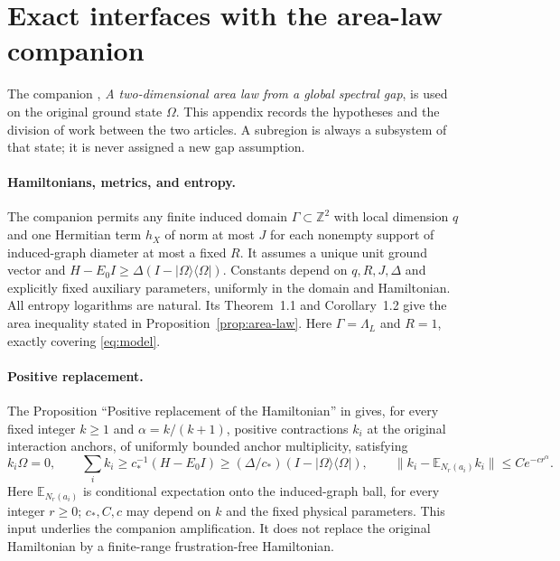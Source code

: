 \section{Exact interfaces with the area-law companion}
\label{app:companion}

The companion \cite{RepoAreaLaw}, \emph{A two-dimensional area law from a
global spectral gap}, is used on the original ground state $\Omega$.
This appendix records the hypotheses and the division of work between the
two articles. A subregion is always a subsystem of that state; it is never
assigned a new gap assumption.

\paragraph{Hamiltonians, metrics, and entropy.}
The companion permits any finite induced domain $\Gamma\subset\mathbb Z^2$
with local dimension $q$ and one Hermitian term $h_X$ of norm at most $J$
for each nonempty support of induced-graph diameter at most a fixed $R$.
It assumes a unique unit ground vector and
$H-E_0I\ge\Delta(I-|\Omega\rangle\langle\Omega|)$.
Constants depend on $q,R,J,\Delta$ and explicitly fixed auxiliary
parameters, uniformly in the domain and Hamiltonian. All entropy logarithms
are natural. Its Theorem~1.1 and Corollary~1.2 give the area inequality
stated in Proposition~\ref{prop:area-law}. Here $\Gamma=\Lambda_L$ and
$R=1$, exactly covering \eqref{eq:model}.

\paragraph{Positive replacement.}
The Proposition ``Positive replacement of the Hamiltonian'' in
\cite[Section~4]{RepoAreaLaw} gives, for every fixed integer $k\ge1$ and
$\alpha=k/(k+1)$, positive contractions $k_i$ at the original interaction
anchors, of uniformly bounded anchor multiplicity, satisfying
\[
 k_i\Omega=0,\qquad
 \sum_i k_i\ge c_*^{-1}(H-E_0I)\ge(\Delta/c_*)(I-|\Omega\rangle\langle\Omega|),
 \qquad
 \|k_i-\mathbb E_{N_r(a_i)}k_i\|\le C e^{-cr^\alpha}.
\]
Here $\mathbb E_{N_r(a_i)}$ is conditional expectation onto the induced-graph
ball, for every integer $r\ge0$; $c_*,C,c$ may depend on $k$ and the fixed physical parameters. This
input underlies the companion amplification. It does not replace the
original Hamiltonian by a finite-range frustration-free Hamiltonian.


